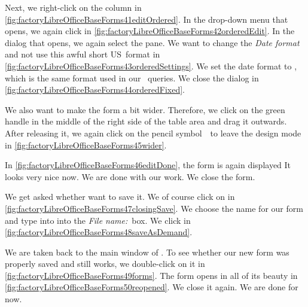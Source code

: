 Next, we right-click on the  column in \cref{fig:factoryLibreOfficeBaseForms41editOrdered}.
In the drop-down menu that opens, we again click  in \cref{fig:factoryLibreOfficeBaseForms42orderedEdit}.
In the dialog that opens, we again select the  pane.
We want to change the \emph{Date format} and not use this awful short US~format in \cref{fig:factoryLibreOfficeBaseForms43orderedSettings}.
We set the date format to , which is the same format used in our \sql\ queries.
We close the dialog in \cref{fig:factoryLibreOfficeBaseForms44orderedFixed}.

We also want to make the form a bit wider.
Therefore, we click on the green handle in the middle of the right side of the table area and drag it outwards.
After releasing it, we again click on the pencil symbol~\libreOfficeBaseDesignMode\ to leave the design mode in \cref{fig:factoryLibreOfficeBaseForms45wider}.

In \cref{fig:factoryLibreOfficeBaseForms46editDone}, the form is again displayed 
It looks very nice now.
We are done with our work.
We close the form.

We get asked whether want to save it.
We of course click on  in \cref{fig:factoryLibreOfficeBaseForms47closingSave}.
We choose the name  for our form and type into into the \emph{File name:}~box.
We click  in \cref{fig:factoryLibreOfficeBaseForms48saveAsDemand}.

We are taken back to the main window of \libreofficeBase.
To see whether our new  form was properly saved and still works, we double-click on it in \cref{fig:factoryLibreOfficeBaseForms49forms}.
The form opens in all of its beauty in \cref{fig:factoryLibreOfficeBaseForms50reopened}.
We close it again.
We are done for now.%
%
\FloatBarrier%
\endhsection%
%

